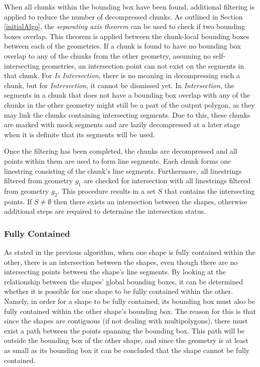 When all chunks within the bounding box have been found, additional filtering is applied to reduce the number of decompressed chunks. As outlined in Section \ref{initialAlgo}, the \textit{separating axis theorem} can be used to check if two bounding boxes overlap. This theorem is applied between the chunk-local bounding boxes between each of the geometries. If a chunk is found to have no bounding box overlap to any of the chunks from the other geometry, assuming no self-intersecting geometries, an intersection point can not exist on the segments in that chunk. For \textit{Is Intersection}, there is no meaning in decompressing such a chunk, but for \textit{Intersection}, it cannot be dismissed yet. In \textit{Intersection}, the segments in a chunk that does not have a bounding box overlap with any of the chunks in the other geometry might still be a part of the output polygon, as they may link the chunks containing intersecting segments. Due to this, these chunks are marked with mock segments and are lazily decompressed at a later stage when it is definite that its segments will be used.

Once the filtering has been completed, the chunks are decompressed and all points within them are used to form line segments. Each chunk forms one linestring consisting of the chunk's line segments. Furthermore, all linestrings filtered from geometry $g_1$ are checked for intersection with all linestrings filtered from  geometry $g_2$. This procedure results in a set $S$ that contains the intersecting points. If $S \neq \emptyset$ then there exists an intersection between the shapes, otherwise additional steps are required to determine the intersection status.

\subsubsection{Fully Contained}
\label{sec:fully_contained}
As stated in the previous algorithm, when one shape is fully contained within the other, there is an intersection between the shapes, even though there are no intersecting points between the shape's line segments. By looking at the relationship between the shapes' global bounding boxes, it can be determined whether it is possible for one shape to be fully contained within the other. Namely, in order for a shape to be fully contained, its bounding box must also be fully contained within the other shape's bounding box. The reason for this is that since the shapes are contiguous (if not dealing with multipolygons), there must exist a path between the points spanning the bounding box. This path will be outside the bounding box of the other shape, and since the geometry is at least as small as its bounding box it can be concluded that the shape cannot be fully contained.

